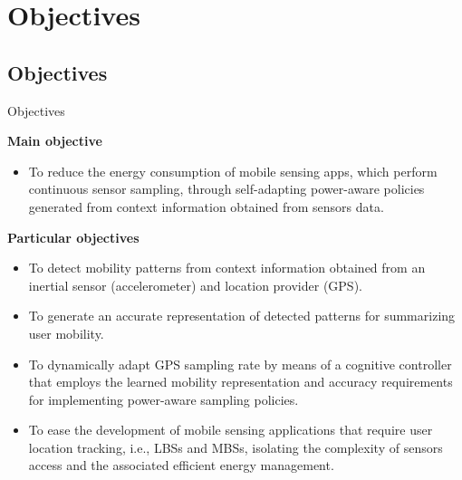 \section{Objectives}
\subsection{Objectives}
\begin{frame}{Objectives}
\small
\begin{block}{\small \textbf{Main objective}}
\begin{itemize}
  \item To reduce the energy consumption of mobile sensing apps, which perform continuous sensor sampling, through self-adapting power-aware policies generated from context information obtained from sensors data.
\end{itemize}
\end{block}

\begin{block}{\small \textbf{Particular objectives}}
\begin{itemize}
  \item To detect mobility patterns from context information obtained from an inertial sensor (accelerometer) and location provider (GPS).
  \item To generate an accurate representation of detected patterns for summarizing user mobility.
  \item To dynamically adapt GPS sampling rate by means of a cognitive controller that employs the learned mobility representation and accuracy requirements for implementing power-aware sampling policies.
  \item To ease the development of mobile sensing applications that require user location tracking, i.e., LBSs and MBSs, isolating the complexity of sensors access and the associated efficient energy management.
\end{itemize}
\end{block}
\end{frame}

